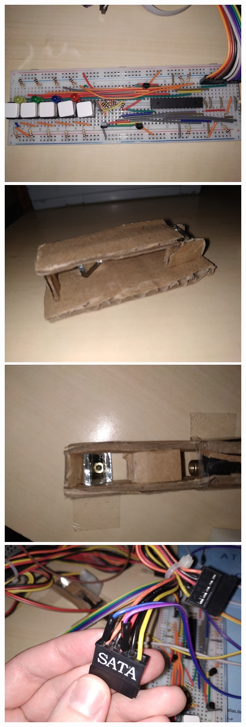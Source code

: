 \documentclass[a4paper,oneside,11pt]{report}
\begin{document}
\begin{enumerate}[1.]
\includegraphics[scale=0.5]{images/12.jpg} 
\includegraphics[scale=0.5]{images/13.jpg} 
\includegraphics[scale=0.5]{images/14.jpg} 
\includegraphics[scale=0.5]{images/15.jpg} 

\end{enumerate}
\end{document}
